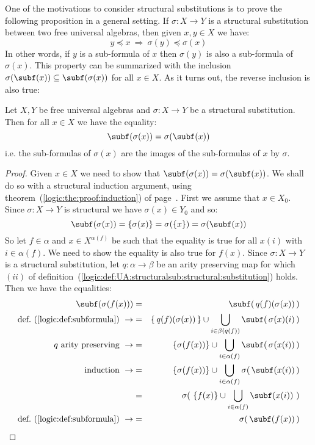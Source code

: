 One of the motivations to consider structural substitutions is to
prove the following proposition in a general setting. If
$\sigma:X\to Y$ is a structural substitution between two free
universal algebras, then given $x,y\in X$ we have:
    \[
    y\preceq x\ \Rightarrow\ \sigma(y)\preceq\sigma(x)
    \]
In other words, if $y$ is a sub-formula of $x$ then $\sigma(y)$ is
also a sub-formula of $\sigma(x)$. This property can be summarized
with the inclusion $\sigma(\subf(x))\subseteq\subf(\sigma(x))$ for
all $x\in X$. As it turns out, the reverse inclusion is also true:
\begin{prop}\label{logic:prop:UA:structuralsub:subformula}
Let $X,Y$ be free universal algebras and $\sigma:X\to Y$ be a
structural substitution. Then for all $x\in X$ we have the equality:
    \[
    \subf(\sigma(x))=\sigma(\subf(x))
    \]
i.e. the sub-formulas of $\sigma(x)$ are the images of the
sub-formulas of $x$ by $\sigma$.
\end{prop}
\begin{proof}
Given $x\in X$ we need to show that
$\subf(\sigma(x))=\sigma(\subf(x))$. We shall do so with a
structural induction argument, using
theorem~(\ref{logic:the:proof:induction}) of
page~\pageref{logic:the:proof:induction}. First we assume that $x\in
X_{0}$. Since $\sigma:X\to Y$ is structural we have $\sigma(x)\in
Y_{0}$ and so:
    \[
    \subf(\sigma(x))=\{\sigma(x)\}=\sigma(\{x\})=\sigma(\subf(x))
    \]
So let $f\in\alpha$ and $x\in X^{\alpha(f)}$ be such that the
equality is true for all $x(i)$ with $i\in\alpha(f)$. We need to
show the equality is also true for $f(x)$. Since $\sigma:X\to Y$ is
a structural substitution, let $q:\alpha\to\beta$ be an arity
preserving map for which $(ii)$ of
definition~(\ref{logic:def:UA:structuralsub:structural:substitution})
holds. Then we have the equalities:
    \begin{eqnarray*}
    \subf(\sigma(f(x)))&=&\subf(\,q(f)(\sigma(x))\,)\\
    \mbox{def.~(\ref{logic:def:subformula})}\ \rightarrow
    &=&\{\,q(f)(\sigma(x))\,\}\cup\bigcup_{i\in\beta(q(f))}\subf(\,\sigma(x)(i)\,)\\
    \mbox{$q$ arity preserving}\ \rightarrow
    &=&\{\sigma(f(x))\}\cup\bigcup_{i\in\alpha(f)}\subf(\,\sigma(x(i))\,)\\
    \mbox{induction}\ \rightarrow&=&\{\sigma(f(x))\}\cup\bigcup_{i\in\alpha(f)}\sigma(\,\subf(x(i))\,)\\
    &=&\sigma(\,\,\{f(x)\}\cup\bigcup_{i\in\alpha(f)}\subf(x(i))\,\,)\\
    \mbox{def.~(\ref{logic:def:subformula})}\ \rightarrow&=&\sigma(\,\subf(f(x))\,)
    \end{eqnarray*}
\end{proof}
